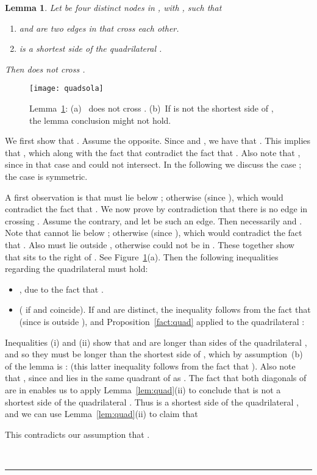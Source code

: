 \pdfoutput=1  \documentclass[11pt]{article}
\newtheorem{lemma}{Lemma}
\newcommand{\qed}{\rule{0.5em}{1.5ex}}
\newcommand{\fqed}{{\hfill~\qed}}
\newenvironment{proof}{{\noindent \bf Proof.}}
                      {{\hfill \fqed} \vspace{1em}}
\begin{document}
\begin{lemma}
Let  be four distinct nodes in , with , such that
\begin{enumerate}
\item [(a)]  and  are two edges
in  that cross each other.
\item [(b)]  is a shortest side of the quadrilateral .
\end{enumerate}
Then  does not cross .
\label{lem:c1}
\end{lemma}
\begin{proof}
\begin{figure}[htbp]
\centering
\texttt{[image: quadsola]}
\caption{Lemma~\ref{lem:c1}: (a)~ does not cross .
(b)~If  is not the shortest side of , the lemma conclusion might not hold.}
\label{fig:c1}
\end{figure}
We first show that . Assume the opposite. Since 
and , we have that . This implies that
, which along with the fact that  contradict
the fact that . Also note that ,
since in that case  and  could not intersect. In the following we
discuss the case ; the case  is symmetric.

A first observation is that  must lie below ; otherwise 
(since ), which would contradict the fact that
. We now prove by contradiction that there
is no edge in  crossing .
Assume the contrary, and let 
be such an edge. Then necessarily  and
. Note that  cannot lie below ;
otherwise 
(since ), which would contradict the fact that
.
Also  must lie outside , otherwise
 could not be in . These together show that 
sits to the right of . See Figure~\ref{fig:c1}(a).
Then the following inequalities regarding the quadrilateral 
must hold:
\begin{itemize}
\item[(i)] , due to the fact that
.
\item[(ii)]  ( if  and  coincide).
If  and  are distinct, the inequality  follows from
the fact that  (since  is outside ),
and
Proposition~\ref{fact:quad}
applied to the quadrilateral :

\end{itemize}
Inequalities (i) and (ii) show that  and  are longer
than sides of the quadrilateral , and so they must be longer
than the shortest side of , which by assumption~(b) of the lemma
is :
 (this latter inequality follows
from the fact that ). Also note that ,
since  and  lies in the same quadrant
of  as . The fact that both diagonals of  are in 
enables us to apply Lemma~\ref{lem:quad}(ii) to conclude that
 is not a shortest side of the quadrilateral . Thus
 is a shortest side of the quadrilateral , and we can use
Lemma~\ref{lem:quad}(ii) to claim that

This contradicts our assumption that .
\end{proof}
\end{document}
